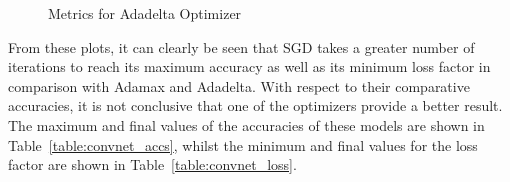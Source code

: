\begin{figure}[!htb]
    \centering
    \begin{subfigure}[htb]{0.49\textwidth}
        \centering
    \end{subfigure}
    \hfill
    \begin{subfigure}[htb]{0.49\textwidth}
        \centering
    \end{subfigure}
    \caption{Metrics for Adadelta Optimizer}
    \label{fig:adadelta}
\end{figure}

From these plots, it can clearly be seen that SGD takes a greater number of iterations to reach its maximum accuracy as well as its minimum loss factor in comparison with Adamax and Adadelta. With respect to their comparative accuracies, it is not conclusive that one of the optimizers provide a better result. The maximum and final values of the accuracies of these models are shown in Table~\ref{table:convnet_accs}, whilst the minimum and final values for the loss factor are shown in Table~\ref{table:convnet_loss}.

